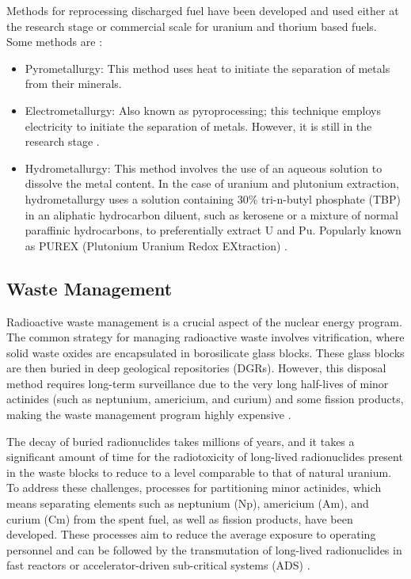 Methods for reprocessing discharged fuel have been developed and used either at the research stage or commercial scale for uranium and thorium based fuels. Some methods are \cite{Th_cycle_viability}:

\begin{itemize}
    \item Pyrometallurgy: This method uses heat to initiate the separation of metals from their minerals. 
    \item Electrometallurgy: Also known as pyroprocessing; this technique employs electricity to initiate the separation of metals. However, it is still in the research stage \cite{Th_cycle_viability}.
    \item Hydrometallurgy: This method involves the use of an aqueous solution to dissolve the metal content. In the case of uranium and plutonium extraction, hydrometallurgy uses a solution containing \(30\%\) tri-n-butyl phosphate (TBP) in an aliphatic hydrocarbon diluent, such as kerosene or a mixture of normal paraffinic hydrocarbons, to preferentially extract U and Pu. Popularly known as PUREX (Plutonium Uranium Redox EXtraction) \cite{fuel_cycle_book}.
\end{itemize}

\subsection{Waste Management}

Radioactive waste management is a crucial aspect of the nuclear energy program. The common strategy for managing radioactive waste involves vitrification, where solid waste oxides are encapsulated in borosilicate glass blocks. These glass blocks are then buried in deep geological repositories (DGRs). However, this disposal method requires long-term surveillance due to the very long half-lives of minor actinides (such as neptunium, americium, and curium) and some fission products, making the waste management program highly expensive \cite{fuel_cycle_book}.

The decay of buried radionuclides takes millions of years, and it takes a significant amount of time for the radiotoxicity of long-lived radionuclides present in the waste blocks to reduce to a level comparable to that of natural uranium\cite{fuel_cycle_book}. To address these challenges, processes for partitioning minor actinides, which means separating elements such as neptunium (Np), americium (Am), and curium (Cm) from the spent fuel, as well as fission products, have been developed. These processes aim to reduce the average exposure to operating personnel and can be followed by the transmutation of long-lived radionuclides in fast reactors or accelerator-driven sub-critical systems (ADS) \cite{fuel_cycle_book}.

